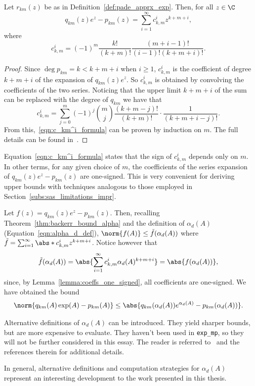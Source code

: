 \begin{lemma}\label{lemma:coeffs_one_signed}
	Let $r_{km}(z)$ be as in Definition~\ref{def:pade_apprx_exp}. Then, for all $z\in\C$
	\[
		q_{km}(z)e^{z}-p_{km}(z)=\sum_{i=1}^{\infty}c_{k,m}^i z^{k+m+i},
	\]
	where
	\begin{equation}\label{eqn:c_km^i_formula}
		c_{k,m}^i = (-1)^m\frac{k!}{(k+m)!}\frac{(m+i-1)!}{(i-1)!(k+m+i)!}.
	\end{equation}
\end{lemma}
\begin{proof}
	Since $\deg p_{km} = k < k+m+i$ when $i\ge 1$, $c_{k,m}^i$ is the coefficient of degree $k+m+i$ of the expansion of $q_{km}(z)e^z$. So $c_{k,m}^i$ is obtained by convolving the coefficients of the two series. Noticing that the upper limit $k+m+i$ of the sum can be replaced with the degree of $q_{km}$ we have that
	\[
		c_{k,m}^i = \sum_{j=0}^m (-1)^j\binom{m}{j}\frac{(k+m-j)!}{(k+m)!}\cdot\frac{1}{(k+m+i-j)!}.
	\]
	From this,~\eqref{eqn:c_km^i_formula} can be proven by induction on $m$. The full details can be found in~\cite{higham:hf19_mpexpm}.
\end{proof}
Equation~\eqref{eqn:c_km^i_formula} states that the sign of $c_{k,m}^i$ depends only on $m$. In other terms, for any given choice of $m$, the coefficients of the series expansion of $q_{km}(z)e^z-p_{km}(z)$ are one-signed.
This is very convenient for deriving upper bounds with techniques analogous to those employed in Section~\ref{subs:sas_limitations_impr}. 

Let $f(z)=q_{km}(z)e^z-p_{km}(z)$. Then, recalling Theorem~\ref{thm:backerr_bound_alpha} and the definition of $\alpha_d(A)$ (Equation~\eqref{eqn:alpha_d_def}), $\norm{f(A)}\le\tilde{f}(\alpha_d(A))$ where $\tilde{f}=\sum_{i=1}^{\infty}\abs*{c_{k,m}^i}z^{k+m+i}$. Notice however that 
\[
	\tilde{f}(\alpha_d(A))=\abs{\sum_{i=1}^{\infty}c_{k,m}^i\alpha_d(A)^{k+m+i}}=\abs{f(\alpha_d(A))},
\]
since, by Lemma~\ref{lemma:coeffs_one_signed}, all coefficients are one-signed. We have obtained the bound
\begin{equation}\label{eqn:q_abserr_bound}
	\norm{q_{km}(A)\exp(A)-p_{km}(A)}\le\abs{q_{km}(\alpha_d(A))e^{\alpha_d(A)}-p_{km}(\alpha_d(A))}.
\end{equation}
\begin{oss*}
	Alternative definitions of $\alpha_d(A)$ can be introduced. They yield sharper bounds, but are more expensive to evaluate.
	They haven't been used in \texttt{exp\_mp}, so they will not be further considered in this essay. The reader is referred to~\cite{higham:hf19_mpexpm} and the references therein for additional details.
	
	In general, alternative definitions and computation strategies for $\alpha_d(A)$ represent an interesting development to the work presented in this thesis.
\end{oss*}

